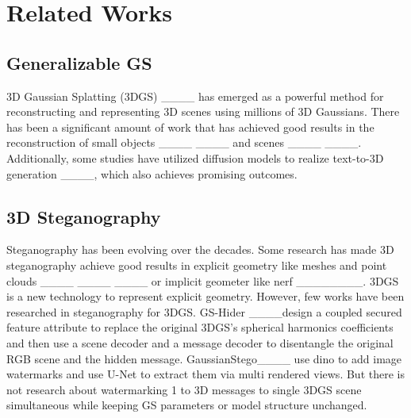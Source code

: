 \section{Related Works}
\subsection{Generalizable GS}
3D Gaussian Splatting (3DGS) ____ has emerged as a powerful method for reconstructing and representing 3D scenes using millions of 3D Gaussians. There has been a significant amount of work that has achieved good results in the reconstruction of small objects ____ ____ and scenes ____ ____. Additionally, some studies have utilized diffusion models to realize text-to-3D generation ____, which also achieves promising outcomes.

\subsection{3D Steganography}
Steganography has been evolving over the decades. Some research has made 3D steganography achieve good results in explicit geometry like meshes and point clouds ____ ____ ____ or implicit geometer like nerf ________. 3DGS is a new technology to represent explicit geometry. However, few works have been researched in steganography for 3DGS. GS-Hider ____design a coupled secured feature attribute to replace the original 3DGS’s spherical harmonics coefficients and then use a scene decoder and a message decoder to disentangle the original RGB scene and the hidden message. GaussianStego____ use dino to add image watermarks and use U-Net to extract them via multi rendered views. But there is not research about watermarking 1 to 3D messages to single 3DGS scene simultaneous while keeping GS parameters or model structure unchanged.